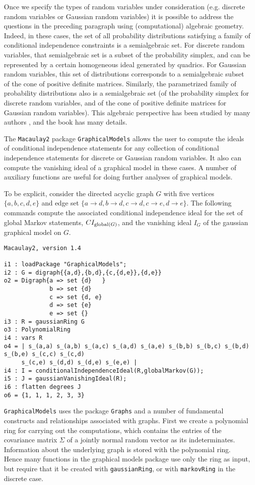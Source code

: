 \documentclass[letterpaper]{article}
\theoremstyle{definition}
\begin{document}
Once we specify the types of random variables under consideration
(e.g. discrete random variables or Gaussian random variables) it
is possible to address the questions in the preceding paragraph
using (computational) algebraic geometry.  Indeed, in these cases,
the set of all probability distributions satisfying a family of 
conditional independence constraints is a semialgebraic set.
For discrete random variables, that semialgebraic set is a subset
of the probability simplex, and can be represented by a certain
homogeneous ideal generated by quadrics.  For Gaussian random variables,
this set of distributions corresponds to a semialgebraic subset
of the cone of positive definite matrices.  Similarly,
the parametrized family of probability distributions also
is a semialgebraic set (of the probability simplex for discrete
random variables, and of the cone of positive definite matrices
for Gaussian random variables).  This algebraic perspective
has been studied by many authors \cite{}, and the book \cite{DSS}
has many details.

The {\tt Macaulay2} package {\tt GraphicalModels} allows the user to compute
the ideals of conditional independence statements for any collection
of conditional independence statements for discrete or Gaussian
random variables.  It also can compute the vanishing ideal of 
a graphical model in these cases.  A number of auxiliary functions
are useful for doing further analyses of graphical models.

To be explicit, consider the directed acyclic graph $G$ with  five
vertices $\{a,b,c,d,e\}$ and edge
set $\{a \to d, b \to d, c \to d, c \to e, d \to e\}$.
The following commands compute the associated conditional
independence ideal for the set of global Markov statements,
$CI_{{\rm global}(G)}$, and 
the vanishing ideal $I_{G}$ of the gaussian graphical model on $G$.

\begin{verbatim}
Macaulay2, version 1.4

i1 : loadPackage "GraphicalModels";
i2 : G = digraph{{a,d},{b,d},{c,{d,e}},{d,e}} 
o2 = Digraph{a => set {d}   }
             b => set {d}
             c => set {d, e}
             d => set {e}
             e => set {}
i3 : R = gaussianRing G
o3 : PolynomialRing
i4 : vars R
o4 = | s_(a,a) s_(a,b) s_(a,c) s_(a,d) s_(a,e) s_(b,b) s_(b,c) s_(b,d) s_(b,e) s_(c,c) s_(c,d)
     s_(c,e) s_(d,d) s_(d,e) s_(e,e) |
i4 : I = conditionalIndependenceIdeal(R,globalMarkov(G));
i5 : J = gaussianVanishingIdeal(R);
i6 : flatten degrees J
o6 = {1, 1, 1, 2, 3, 3}
\end{verbatim}
 {\tt GraphicalModels} uses the package {\tt Graphs} and a number of fundamental constructs and relationships 
associated with graphs.  First we create a polynomial ring
for carrying out the computations, which contains the entries of
the covariance matrix $\Sigma$ of a jointly normal random vector
as its indeterminates.  Information about the underlying graph is stored with the polynomial ring. 
Hence many functions in the graphical models package use only the ring as input, but require that it be created with {\tt gaussianRing}, or with {\tt markovRing} in the discrete case.
\end{document}
